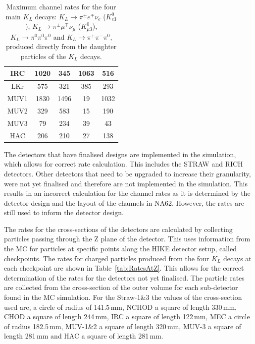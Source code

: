 \documentclass[../../main.tex]{subfiles}
\begin{document}
\begin{table}[htbp]
{\begin{tabular}{|c|ccll}
            IRC & \multicolumn{1}{c|}{1020} & \multicolumn{1}{c|}{345} & \multicolumn{1}{c|}{1063} & \multicolumn{1}{c|}{516} \\ \hline
            LKr & \multicolumn{1}{c|}{575} & \multicolumn{1}{c|}{321} & \multicolumn{1}{c|}{385} & \multicolumn{1}{c|}{293} \\ \hline
            MUV1 & \multicolumn{1}{c|}{1830} & \multicolumn{1}{c|}{1496} & \multicolumn{1}{c|}{19} & \multicolumn{1}{c|}{1032} \\ \hline
            MUV2 & \multicolumn{1}{c|}{329} & \multicolumn{1}{c|}{583} & \multicolumn{1}{c|}{15} & \multicolumn{1}{c|}{190} \\ \hline
            MUV3 & \multicolumn{1}{c|}{79} & \multicolumn{1}{c|}{234} & \multicolumn{1}{c|}{39} & \multicolumn{1}{c|}{43} \\ \hline
            HAC & \multicolumn{1}{c|}{206} & \multicolumn{1}{c|}{210} & \multicolumn{1}{c|}{27} & \multicolumn{1}{c|}{138} \\ \hline
            \end{tabular}
        }
        \caption{Maximum channel rates for the four main $K_L$ decays: $ K_L \to \pi^{\pm} e^{\mp} \nu_e$ ($K_{e3}^{0}$), $ K_L \to \pi^{\pm} \mu^{\mp} \nu_{\mu}$ ($K_{\mu 3}^{0}$), $ K_L \to \pi^{0} \pi^{0} \pi^{0}$ and $ K_L \to \pi^{+} \pi^{-} \pi^{0}$, produced directly from the daughter particles of the $K_L$ decays.}%
        \label{tab:maxChannelRates}
    \end{table}

    The detectors that have finalised designs are implemented in the simulation, which allows for correct rate calculation. This includes the STRAW and RICH detectors. Other detectors that need to be upgraded to increase their granularity, were not yet finalised and therefore are not implemented in the simulation. This results in an incorrect calculation for the channel rates as it is determined by the detector design and the layout of the channels in NA62. However, the rates are still used to inform the detector design. 
    
    The rates for the cross-sections of the detectors are calculated by collecting particles passing through the Z plane of the detector. This uses information from the \gls{MC} for particles at specific points along the \gls{HIKE} detector setup, called checkpoints. The rates for charged particles produced from the four $K_L$ decays at each checkpoint are shown in Table~\ref{tab:RatesAtZ}. This allows for the correct determination of the rates for the detectors not yet finalised. 
    The particle rates are collected from the cross-section of the outer volume for each sub-detector found in the \gls{MC} simulation. 
    For the Straw-1\&3 the values of the cross-section used are, a circle of radius of 141.5\,mm, NCHOD a square of length 330\,mm, CHOD a square of length 244\,mm, IRC a square of length 122\,mm, MEC a circle of radius 182.5\,mm, MUV-1\&2 a square of length 320\,mm,  MUV-3 a square of length 281\,mm and HAC a square of length 281\,mm. 
    
\end{document}
